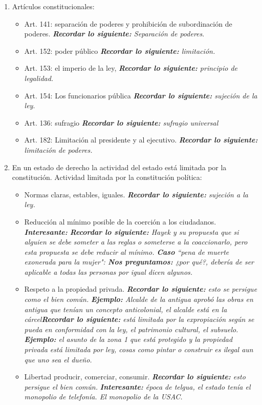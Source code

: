 \begin{enumerate}
    \item Artículos constitucionales:
        \begin{itemize}
            \item Art. 141: separación de poderes y prohibición de subordinación de poderes. \emph{\textbf{Recordar lo siguiente: }Separación de poderes}.
            \item Art. 152: poder público \emph{\textbf{Recordar lo siguiente: }limitación.}
            \item Art. 153: el imperio de la ley, \emph{\textbf{Recordar lo siguiente: }principio de legalidad.}
            \item Art. 154: Los funcionarios pública \emph{\textbf{Recordar lo siguiente: } sujeción de la ley}.
            \item Art. 136: sufragio \emph{\textbf{Recordar lo siguiente: }sufragio universal}
            \item Art. 182: Limitación al presidente y al ejecutivo. \emph{\textbf{Recordar lo siguiente: }limitación de poderes.}
        \end{itemize}
    
    \item En un estado de derecho la actividad del estado está limitada por la constitución. Actividad limitada por la constitución política: 
        \begin{itemize}
            \item Normas claras, estables, iguales. \emph{\textbf{Recordar lo siguiente: }sujeción a la ley.}
            \item Reducción al mínimo posible de la coerción a los ciudadanos. \emph{\textbf{Interesante:} \emph{\textbf{Recordar lo siguiente: }Hayek y su propuesta que si alguien se debe someter a las reglas o someterse a la coaccionarlo, pero esta propuesta se debe reducir al mínimo.} \emph{\textbf{Caso} ``pena de muerte exonerada para la mujer": \textbf{Nos preguntamos:} ¿por qué?, debería de ser aplicable a todas las personas por igual dicen algunos.}}
            \item Respeto a la propiedad privada. \emph{\textbf{Recordar lo siguiente: } esto se persigue como el bien común. } \emph{\textbf{Ejemplo: }Alcalde de la antigua aprobó las obras en antigua que tenían un concepto anticolonial, el alcalde está en la cárcel}\emph{\textbf{Recordar lo siguiente: }está limitada por la expropiación según se pueda en conformidad con la ley, el patrimonio cultural, el subsuelo.} \emph{\textbf{Ejemplo: }el asunto de la zona 1 que está protegido y la propiedad privada está limitada por ley, cosas como pintar o construir es ilegal aun que uno sea el dueño.}
            \item Libertad producir, comerciar, consumir. \emph{\textbf{Recordar lo siguiente: } esto persigue el bien común.} \emph{\textbf{Interesante:} época de telgua, el estado tenía el monopolio de telefonía. El monopolio de la USAC. }
        \end{itemize}  
\end{enumerate}
